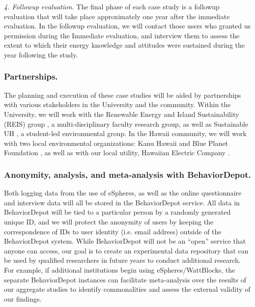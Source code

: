 {\em 4. Followup evaluation.}  The final phase of each case study
is a followup evaluation that will take place approximately one year after
the immediate evaluation.   In the followup evaluation, we will contact
those users who granted us permission during the Immediate evaluation, and
interview them to assess the extent to which their energy knowledge and
attitudes were sustained during the year following the study. 

\subsubsection{Partnerships.}

The planning and execution of these case studies will be aided by 
partnerships with various stakeholders in the University and the community.
Within the University, we will work with the Renewable Energy and Island
Sustainability (REIS) group \cite{REIS}, a multi-disciplinary faculty
research group, as well as Sustainable UH \cite{SustainableUH}, a
student-led environmental group.  In the Hawaii community, we will work
with two local environmental organizations: Kanu Hawaii \cite{KanuHawaii}
and Blue Planet Foundation \cite{BluePlanetFoundation}, as well as with our
local utility, Hawaiian Electric Company \cite{HECO}.  


\subsubsection{Anonymity, analysis,  and meta-analysis with BehaviorDepot.}

Both logging data from the use of eSpheres, as well as the online
questionnaire and interview data will all be stored in the BehaviorDepot
service.  All data in BehaviorDepot will be tied to a particular person by
a randomly generated unique ID, and we will protect the anonymity of users
by keeping the correspondence of IDs to user identity (i.e. email address)
outside of the BehaviorDepot system.  While BehaviorDepot will not be an
``open'' service that anyone can access, our goal is to create an
experimental data repository that can be used by qualified researchers in
future years to conduct additional research.  For example, if additional
institutions begin using eSpheres/WattBlocks, the separate BehaviorDepot
instances can facilitate meta-analysis over the results of our aggregate
studies to identify commonalities and assess the external validity of our
findings.


